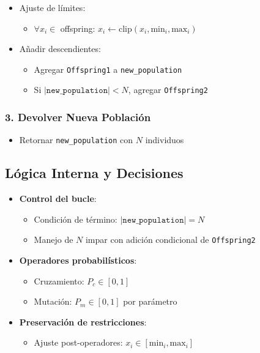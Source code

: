 \begin{enumerate}[label= (\alph*)]
\begin{itemize}
        \item Ajuste de límites:
        \begin{itemize}
            \item $\forall x_i \in$ offspring: $x_i \leftarrow \text{clip}(x_i, \text{min}_i, \text{max}_i)$
        \end{itemize}

        \item Añadir descendientes:
        \begin{itemize}
            \item Agregar \texttt{Offspring1} a \texttt{new\_population}
            \item Si $|\texttt{new\_population}| < N$, agregar \texttt{Offspring2}
        \end{itemize}
    \end{itemize}
\end{enumerate}

\subsubsection*{3. Devolver Nueva Población}
\begin{itemize}
    \item Retornar \texttt{new\_population} con $N$ individuos
\end{itemize}

\subsection*{Lógica Interna y Decisiones}
\begin{itemize}
    \item \textbf{Control del bucle}:
    \begin{itemize}
        \item Condición de término: $|\texttt{new\_population}| = N$
        \item Manejo de $N$ impar con adición condicional de \texttt{Offspring2}
    \end{itemize}

    \item \textbf{Operadores probabilísticos}:
    \begin{itemize}
        \item Cruzamiento: $P_c \in [0,1]$
        \item Mutación: $P_m \in [0,1]$ por parámetro
    \end{itemize}

    \item \textbf{Preservación de restricciones}:
    \begin{itemize}
        \item Ajuste post-operadores: $x_i \in [\text{min}_i, \text{max}_i]$
    \end{itemize}
\end{itemize}

